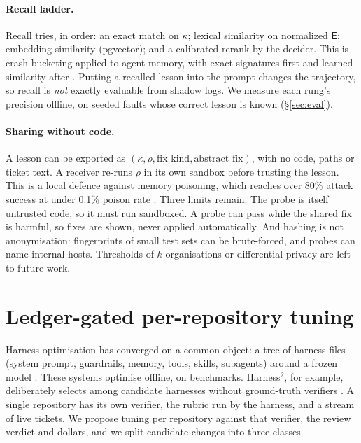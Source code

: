 \documentclass[11pt]{article}
\theoremstyle{remark}
\newcommand{\Eerr}{\mathsf{E}}
\begin{document}
\paragraph{Recall ladder.}
Recall tries, in order: an exact match on $\kappa$; lexical similarity on normalized $\Eerr$; embedding similarity (pgvector); and a calibrated rerank by the decider. This is crash bucketing applied to agent memory, with exact signatures first and learned similarity after \citep{glerum2009wer,rodrigues2022tracesim}. Putting a recalled lesson into the prompt changes the trajectory, so recall is \emph{not} exactly evaluable from shadow logs. We measure each rung's precision offline, on seeded faults whose correct lesson is known (\S\ref{sec:eval}).

\paragraph{Sharing without code.}
A lesson can be exported as $(\kappa,\rho,\text{fix kind},\text{abstract fix})$, with no code, paths or ticket text. A receiver re-runs $\rho$ in its own sandbox before trusting the lesson. This is a local defence against memory poisoning, which reaches over 80\% attack success at under 0.1\% poison rate \citep{chen2024agentpoison}. Three limits remain. The probe is itself untrusted code, so it must run sandboxed. A probe can pass while the shared fix is harmful, so fixes are shown, never applied automatically. And hashing is not anonymisation: fingerprints of small test sets can be brute-forced, and probes can name internal hosts. Thresholds of $k$ organisations or differential privacy are left to future work.

\section{Ledger-gated per-repository tuning}
\label{sec:tune}

Harness optimisation has converged on a common object: a tree of harness files (system prompt, guardrails, memory, tools, skills, subagents) around a frozen model \citep{xu2026harness2,metaharness2026,ahe2026,selfharness2026,rrsi2026}. These systems optimise offline, on benchmarks. Harness$^2$, for example, deliberately selects among candidate harnesses without ground-truth verifiers \citep{xu2026harness2}. A single repository has its own verifier, the rubric run by the harness, and a stream of live tickets. We propose tuning per repository against that verifier, the review verdict and dollars, and we split candidate changes into three classes.
\end{document}
